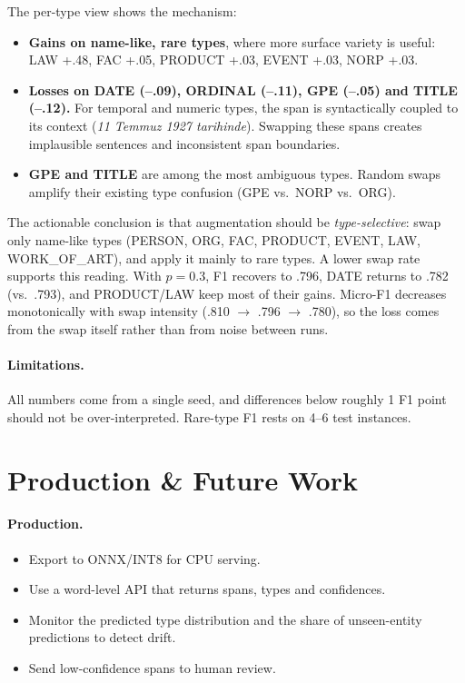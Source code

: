 \documentclass[11pt]{article}
\begin{document}
The per-type view shows the mechanism:
\begin{itemize}
\item \textbf{Gains on name-like, rare types}, where more surface variety is useful: LAW +.48, FAC +.05, PRODUCT +.03, EVENT +.03, NORP +.03.
\item \textbf{Losses on DATE (--.09), ORDINAL (--.11), GPE (--.05) and TITLE (--.12).} For temporal and numeric types, the span is syntactically coupled to its context (\textit{11 Temmuz 1927 tarihinde}). Swapping these spans creates implausible sentences and inconsistent span boundaries.
\item \textbf{GPE and TITLE} are among the most ambiguous types. Random swaps amplify their existing type confusion (GPE vs.\ NORP vs.\ ORG).
\end{itemize}
The actionable conclusion is that augmentation should be \emph{type-selective}: swap only name-like types (PERSON, ORG, FAC, PRODUCT, EVENT, LAW, WORK\_OF\_ART), and apply it mainly to rare types. A lower swap rate supports this reading. With $p{=}0.3$, F1 recovers to .796, DATE returns to .782 (vs.\ .793), and PRODUCT/LAW keep most of their gains. Micro-F1 decreases monotonically with swap intensity (.810 $\to$ .796 $\to$ .780), so the loss comes from the swap itself rather than from noise between runs.

\paragraph{Limitations.} All numbers come from a single seed, and differences below roughly 1 F1 point should not be over-interpreted. Rare-type F1 rests on 4--6 test instances.

\section{Production \& Future Work}
\paragraph{Production.}
\begin{itemize}
\item Export to ONNX/INT8 for CPU serving.
\item Use a word-level API that returns spans, types and confidences.
\item Monitor the predicted type distribution and the share of unseen-entity predictions to detect drift.
\item Send low-confidence spans to human review.
\end{itemize}
\end{document}
